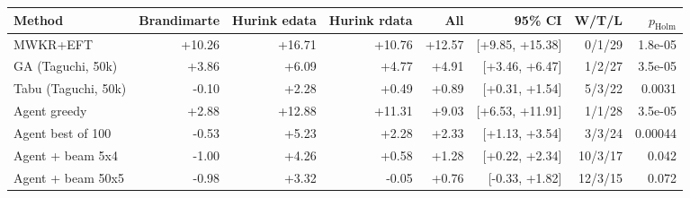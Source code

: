 \begin{tabular}{lrrrrrrr}
\toprule
Method & Brandimarte & Hurink edata & Hurink rdata & All & 95\% CI & W/T/L & $p_{\mathrm{Holm}}$ \\
\midrule
MWKR+EFT & +10.26 & +16.71 & +10.76 & +12.57 & [+9.85, +15.38] & 0/1/29 & 1.8e-05 \\
GA (Taguchi, 50k) & +3.86 & +6.09 & +4.77 & +4.91 & [+3.46, +6.47] & 1/2/27 & 3.5e-05 \\
Tabu (Taguchi, 50k) & -0.10 & +2.28 & +0.49 & +0.89 & [+0.31, +1.54] & 5/3/22 & 0.0031 \\
Agent greedy & +2.88 & +12.88 & +11.31 & +9.03 & [+6.53, +11.91] & 1/1/28 & 3.5e-05 \\
Agent best of 100 & -0.53 & +5.23 & +2.28 & +2.33 & [+1.13, +3.54] & 3/3/24 & 0.00044 \\
Agent + beam 5x4 & -1.00 & +4.26 & +0.58 & +1.28 & [+0.22, +2.34] & 10/3/17 & 0.042 \\
Agent + beam 50x5 & -0.98 & +3.32 & -0.05 & +0.76 & [-0.33, +1.82] & 12/3/15 & 0.072 \\
\bottomrule
\end{tabular}
